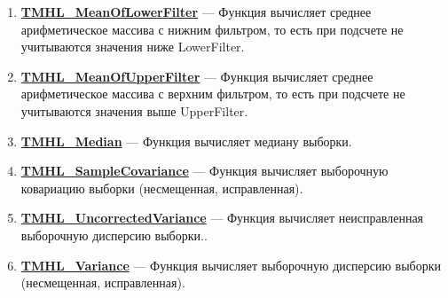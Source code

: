\documentclass[a4paper,12pt]{article}
\begin{document}
\begin{enumerate}
\item \textbf{\hyperref[TMHL_MeanOfLowerFilter]{TMHL\_MeanOfLowerFilter}} --- Функция вычисляет среднее арифметическое массива с нижним фильтром, то есть при подсчете не учитываются значения ниже LowerFilter.

\item \textbf{\hyperref[TMHL_MeanOfUpperFilter]{TMHL\_MeanOfUpperFilter}} --- Функция вычисляет среднее арифметическое массива с верхним фильтром, то есть при подсчете не учитываются значения выше UpperFilter.

\item \textbf{\hyperref[TMHL_Median]{TMHL\_Median}} --- Функция вычисляет медиану выборки.

\item \textbf{\hyperref[TMHL_SampleCovariance]{TMHL\_SampleCovariance}} --- Функция вычисляет выборочную ковариацию выборки (несмещенная, исправленная).

\item \textbf{\hyperref[TMHL_UncorrectedVariance]{TMHL\_UncorrectedVariance}} --- Функция вычисляет неисправленная выборочную дисперсию выборки..

\item \textbf{\hyperref[TMHL_Variance]{TMHL\_Variance}} --- Функция вычисляет выборочную дисперсию выборки (несмещенная, исправленная).

\end{enumerate}
\end{document}
